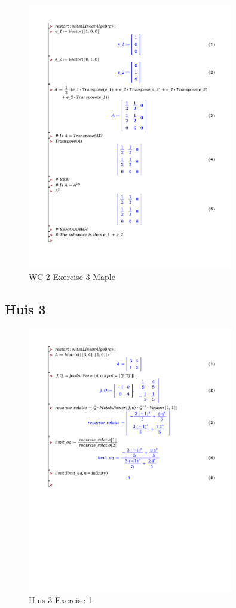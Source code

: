 \documentclass[a4paper]{article}
\begin{document}
\begin{figure}[H]
	\centering
	\includegraphics[width=0.8\textwidth]{exercises/wc_2_ex_3.pdf}
	\caption{WC 2 Exercise 3 Maple}
	\label{fig:wc_2_ex_3_maple}
\end{figure}

\newpage
\subsection*{Huis 3}


\begin{figure}[H]
	\centering
	\includegraphics[width=0.8\textwidth]{exercises/huis_3_ex_1.pdf}
	\caption{Huis 3 Exercise 1}
	\label{fig:huis_3_ex_1_Maple}
\end{figure}
\end{document}
